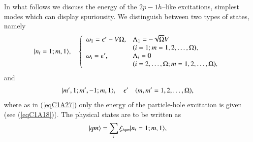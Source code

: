 In what follows we discuss the energy of the $2p-1h$--like excitations, simplest modes which can display spuriousity. We
distinguish between two types of states, namely
 \begin{align}\label{eqC1A27} 
|{n_i=1;m,1} \rangle,\quad\left\{
\begin{array}{ll}
\omega_1=\epsilon'-V\Omega, &\Lambda_1=-\sqrt{\Omega}V\\
&(i=1;m=1,2,\dots,\Omega),  \\ 
\omega_i=\epsilon', &\Lambda_i=0\\
&(i=2,\dots,\Omega; m=1,2,\dots,\Omega),
\end{array} \right. 
 \end{align}
and
 \begin{align}\label{eqC1A28} 
|{m',1;m',-1;m,1} \rangle,\quad\epsilon'\quad(m,m'=1,2,\dots,\Omega),
 \end{align}
 where as in (\ref{eqC1A27}) only the energy of the particle-hole excitation is given (see (\ref{eqC1A18})). 
The physical states are to be written as
 \begin{align}\label{eqC1A29} 
|{qm} \rangle=\sum_i\xi_{iqm}|{n_i=1;m,1} \rangle,
 \end{align}
 
